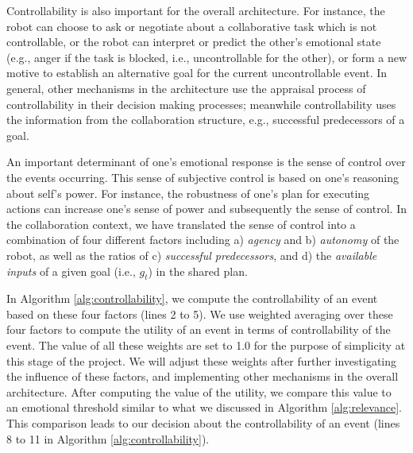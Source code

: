 Controllability is also important for the overall architecture. For instance,
the robot can choose to ask or negotiate about a collaborative task which is
not controllable, or the robot can interpret or predict the other's emotional
state (e.g., anger if the task is blocked, i.e., uncontrollable for the other),
or form a new motive to establish an alternative goal for the current
uncontrollable event. In general, other mechanisms in the architecture use the
appraisal process of controllability in their decision making processes;
meanwhile controllability uses the information from the collaboration structure,
e.g., successful predecessors of a goal.

An important determinant of one's emotional response is the sense of control
over the events occurring. This sense of subjective control is based on one's
reasoning about self's power. For instance, the robustness of one's plan for
executing actions can increase one's sense of power and subsequently the sense
of control. In the collaboration context, we have translated the sense of control
into a combination of four different factors including a) \textit{agency} and b)
\textit{autonomy} of the robot, as well as the ratios of c) \textit{successful
predecessors}, and d) the \textit{available inputs} of a given goal
(i.e., $\mathit{g}_{t}$) in the shared plan.

In Algorithm \ref{alg:controllability}, we compute the controllability of an
event based on these four factors (lines 2 to 5). We use weighted averaging over
these four factors to compute the utility of an event in terms of
controllability of the event. The value of all these weights are set to 1.0 for
the purpose of simplicity at this stage of the project. We will adjust these
weights after further investigating the influence of these factors, and
implementing other mechanisms in the overall architecture. After computing the
value of the utility, we compare this value to an emotional threshold similar to
what we discussed in Algorithm \ref{alg:relevance}. This comparison leads to our
decision about the controllability of an event (lines 8 to 11 in Algorithm
\ref{alg:controllability}).

% 

